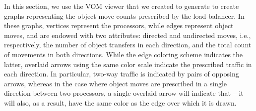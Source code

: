 In this section, we use the VOM viewer that we created to generate 
to create graphs representing the object move counts prescribed by 
the load-balancer.
In these graphs, vertices represent the processors, while edges
represent object moves, and are endowed with two attributes: directed
and undirected moves, i.e., respectively, the number of object
transfers in each direction, and the total count of movements in both
directions. 
While the edge coloring scheme indicates the latter, overlaid arrows
using the same color scale indicate the prescribed traffic in each
direction.
In particular, two-way traffic is indicated by pairs of opposing
arrows, whereas in the case where object moves are prescribed in a
single direction between two processors, a single overlaid arrow will
indicate that -- it will also, as a result, have the same color as the
edge over which it is drawn.
